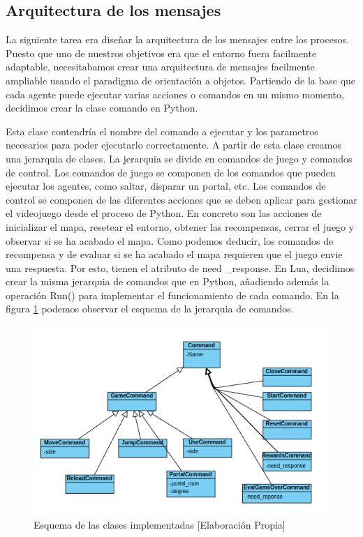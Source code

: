 \subsection{Arquitectura de los mensajes}

La siguiente tarea era diseñar la arquitectura de los mensajes entre los procesos. Puesto que uno de nuestros objetivos era que el entorno fuera facilmente adaptable, necesitabamos crear una arquitectura de mensajes facilmente ampliable usando el paradigma de orientación a objetos. Partiendo de la base que cada agente puede ejecutar varias acciones o comandos en un mismo momento, decidimos crear la clase comando en Python.

Esta clase contendría el nombre del comando a ejecutar y los parametros necesarios para poder ejecutarlo correctamente. A partir de esta clase creamos una jerarquia de clases. La jerarquia se divide en comandos de juego y comandos de control. Los comandos de juego se componen de los comandos que pueden ejecutar los agentes, como saltar, disparar un portal, etc. Los comandos de control se componen de las diferentes acciones que se deben aplicar para gestionar el videojuego desde el proceso de Python. En concreto son las acciones de inicializar el mapa, resetear el entorno, obtener las recompensas, cerrar el juego y observar si se ha acabado el mapa. Como podemos deducir, los comandos de recompensa y de evaluar si se ha acabado el mapa requieren que el juego envie una respuesta. Por esto, tienen el atributo de need \_response. En Lua, decidimos crear la misma jerarquia de comandos que en Python, añadiendo además la operación Run() para implementar el funcionamiento de cada comando. En la figura \ref {fig:clases} podemos observar el esquema de la jerarquia de comandos.

\begin{figure}[ht]
    \centering
    \includegraphics[width=1.0\textwidth]{img/clases.png}
    \caption{Esquema de las clases implementadas [Elaboración Propia]}
    \label{fig:clases}
\end{figure}

